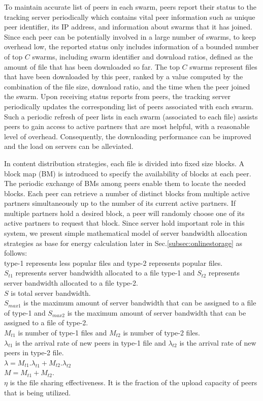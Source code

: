 \documentclass[conference]{IEEEtran}
\begin{document}
To maintain accurate list of peers in each swarm, peers report their status to the tracking server periodically which contains vital peer information such as unique peer identifier, its IP address, and information about swarms that it has joined. 
Since each peer can be potentially involved in a large number of swarms, to keep overhead low, the reported status only includes information of a bounded number of top $C$ swarms, including swarm identifier and download ratios, defined as the amount of file that has been downloaded so far. 
The top $C$ swarms represent files that have been downloaded by this peer, ranked by a value computed by the combination of the file size, download ratio, and the time when the peer joined the swarm. 
Upon receiving status reports from peers, the tracking server periodically updates the corresponding list of peers associated with each swarm.
Such a periodic refresh of peer lists in each swarm (associated to each file) assists peers to gain access to active partners that are most helpful, with a reasonable level of overhead. 
Consequently, the downloading performance can be improved and the load on servers can be alleviated. 

In content distribution strategies, each file is divided into fixed size blocks.
A block map (BM) is introduced to specify the availability of blocks at each peer. 
The periodic exchange of BMs among peers enable them to locate the needed blocks. 
Each peer can retrieve a number of distinct blocks from multiple active partners simultaneously up to the number of its current active partners.
If multiple partners hold a desired block, a peer will randomly choose one of its active partners to request that block.
Since server hold important role in this system, we present simple mathematical model of server bandwidth allocation strategies \cite{4024139,Sun:2009:POS:1542245.1542249} as base for energy calculation later in Sec.\ref{subsec:onlinestorage} as follows:\\
type-1 represents less popular files and type-2 represents popular files. \\
$S_{t1}$ represents server bandwidth allocated to a file type-1 and $S_{t2}$ represents server bandwidth allocated to a file type-2. \\
$S$ is total server bandwidth. \\
$S_{max1}$ is the maximum amount of server bandwidth that can be assigned to a file of type-1 and $S_{max2}$ is the maximum amount of server bandwidth that can be assigned to a file of type-2.\\
$M_{t1}$ is number of type-1 files and  $M_{t2}$ is number of type-2 files.\\
$\lambda_{t1}$ is the arrival rate of new peers in type-1 file and $\lambda_{t2}$ is the arrival rate of new peers in type-2 file.\\
$\lambda = M_{t1}.\lambda_{t1} + M_{t2}.\lambda_{t2}$\\
$M=M_{t1} + M_{t2}$.\\
$\eta$ is the file sharing effectiveness. It is the fraction of the upload capacity of peers that is being utilized.\\
\end{document}
